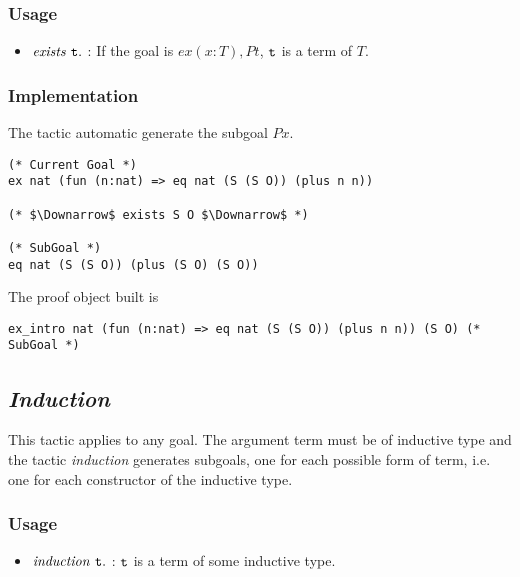 \subsubsection*{Usage}
\begin{itemize}
\item ${\it exists}\ \tt t.$ : If the goal is $ex (x:T), P t$, $\tt t$ is a term of $T$. 
\end{itemize}

\subsubsection*{Implementation}
The tactic automatic generate the subgoal $P x$.
\begin{center}
\begin{minipage}{0.7\textwidth}
\begin{verbatim}
(* Current Goal *)                                                           
ex nat (fun (n:nat) => eq nat (S (S O)) (plus n n))

(* $\Downarrow$ exists S O $\Downarrow$ *)

(* SubGoal *)
eq nat (S (S O)) (plus (S O) (S O))
\end{verbatim}
\end{minipage}
\end{center}

The proof object built is
\begin{center}
\begin{minipage}{0.7\textwidth}
\begin{verbatim}
ex_intro nat (fun (n:nat) => eq nat (S (S O)) (plus n n)) (S O) (* SubGoal *)
\end{verbatim}
\end{minipage}
\end{center}

\subsection{\it Induction}

This tactic applies to any goal. 
The argument term must be of inductive type and the tactic {\it induction} generates subgoals, 
one for each possible form of term, i.e. one for each constructor of the inductive type.

\subsubsection*{Usage}
\begin{itemize}
\item ${\it induction}\ \tt t.$ : $\tt t$ is a term of some inductive type.
\end{itemize}

